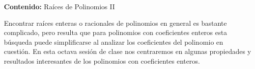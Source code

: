 {\Large
    \textbf{Contenido:} Raíces de Polinomios II
}

Encontrar raíces enteras o racionales de polinomios en general es bastante complicado, pero resulta que para polinomios con
coeficientes enteros esta búsqueda puede simplificarse al analizar los coeficientes del polinomio en cuestión.
En esta octava sesión de clase nos centraremos en algunas propiedades y resultados interesantes de los polinomios con coeficientes enteros.
